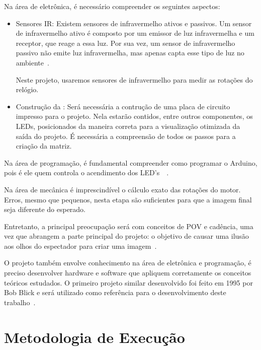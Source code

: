 Na área de eletrônica, é necessário compreender os seguintes aspectos:
\begin{itemize}
\item Sensores IR: Existem sensores de infravermelho ativos e passivos. Um sensor de infravermelho ativo é composto por um emissor de luz infravermelha e um receptor, que reage a essa luz. Por sua vez, um sensor de infravermelho passivo não emite luz infravermelha, mas apenas capta esse tipo de luz no ambiente~\cite{RoboLivre2014}.

    Neste projeto, usaremos sensores de infravermelho para medir as rotações do relógio.
\item Construção da : Será necessária a contrução de uma placa de circuito impresso para o projeto. Nela estarão contidos, entre outros componentes, os LEDs, posicionados da maneira correta para a visualização otimizada da saída do projeto. É necessária a compreensão de todos os passos para a criação da matriz.
\end{itemize}

Na área de programação, é fundamental compreender como programar o Arduino, pois é ele quem controla o acendimento dos LED's~\cite{Arduino2014}~\cite{ArduinoRef2014}.

Na área de mecânica é imprescindível o cálculo exato das rotações do motor. Erros, mesmo que pequenos, nesta etapa são suficientes para que a imagem final seja diferente do esperado.

Entretanto, a principal preocupação será com conceitos de POV e cadência, uma vez que abrangem a parte principal do projeto: o objetivo de causar uma ilusão aos olhos do espectador para criar uma imagem~\cite{Anderson1993}.

	O projeto também envolve conhecimento na área de eletrônica e programação, é preciso desenvolver hardware e software que apliquem corretamente os conceitos teóricos estudados. O primeiro projeto similar desenvolvido foi feito em 1995 por Bob Blick e será utilizado como referência para o desenvolvimento deste trabalho~\cite{Blick2002}.

\section{Metodologia de Execução} %


